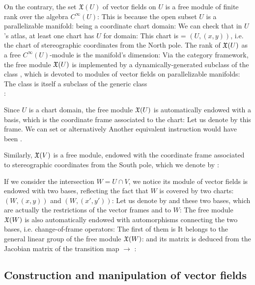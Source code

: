 On the contrary, the set $\mathfrak{X}(U)$ of vector fields on $U$ is a free module of
finite rank over the algebra $C^\infty(U)$:
This is because the open subset $U$ is a parallelizable manifold:
being a coordinate chart domain:
We can check that in $U$'s atlas, at least one chart has $U$ for domain:
This chart is  = $(U, (x,y))$, i.e. the chart of stereographic coordinates
from the North pole.
The rank of $\mathfrak{X}(U)$ as a free $C^\infty(U)$-module is the manifold's dimension:
Via the category framework,
the free module $\mathfrak{X}(U)$ is implemented by a dynamically-generated subclass
of the class , which is devoted to modules of vector fields
on parallelizable manifolds:
The class  is itself a subclass
of the generic class\\ :

Since $U$ is a chart domain, the free module $\mathfrak{X}(U)$ is automatically endowed with a basis,
which is the coordinate frame associated to the chart:
Let us denote by  this frame. We can set  or
alternatively
Another equivalent instruction would have been .

Similarly, $\mathfrak{X}(V)$ is a free module, endowed with the coordinate frame
associated to stereographic coordinates from the South pole, which we
denote by :

If we consider the intersection $W=U\cap V$, we notice its module
of vector fields is endowed with two bases, reflecting the fact that
$W$ is covered by two charts: $(W,(x,y))$ and $(W,(x',y'))$:
Let us denote by  and  these two bases, which are
actually the restrictions of the vector frames  and  to
$W$:
The free module $\mathfrak{X}(W)$ is also automatically endowed with automorphisms
connecting the two bases, i.e. change-of-frame operators:
The first of them is
It belongs to the general linear group of the free module $\mathfrak{X}(W)$:
and its matrix is deduced from the Jacobian matrix of the transition map
 $\to$ :

\subsection{Construction and manipulation of vector fields}

